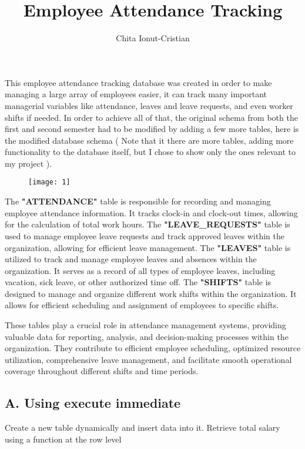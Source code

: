 \documentclass[11pt]{article} %
\title{Employee Attendance Tracking}
\author{Chita Ionut-Cristian}
\date{}
\begin{document}
\maketitle

This employee attendance tracking database was created in order to make managing a large array of employees easier, it can track many important managerial variables like attendance, leaves and leave requests, and even worker shifts if needed. In order to achieve all of that, the original schema from both the first and second semester had to be modified by adding a few more tables, here is the modified database schema ( Note that it there are more tables, adding more functionality to the database itself, but I chose to show only the ones relevant to my project ).

\begin{figure}[h!]
  \centering
  \texttt{[image: 1]}
\end{figure}

The \textbf{"ATTENDANCE"} table is responsible for recording and managing employee attendance information. It tracks clock-in and clock-out times, allowing for the calculation of total work hours. The \textbf{"LEAVE\_REQUESTS"} table is used to manage employee leave requests and track approved leaves within the organization, allowing for efficient leave management. The \textbf{"LEAVES"} table is utilized to track and manage employee leaves and absences within the organization. It serves as a record of all types of employee leaves, including vacation, sick leave, or other authorized time off. The \textbf{"SHIFTS"} table is designed to manage and organize different work shifts within the organization. It allows for efficient scheduling and assignment of employees to specific shifts. 

These tables play a crucial role in attendance management systems, providing valuable data for reporting, analysis, and decision-making processes within the organization. They contribute to efficient employee scheduling, optimized resource utilization, comprehensive leave management, and facilitate smooth operational coverage throughout different shifts and time periods.

\subsection*{A.	Using execute immediate}

Create a new table dynamically and insert data into it. Retrieve total salary using a function at the row level
\end{document}
